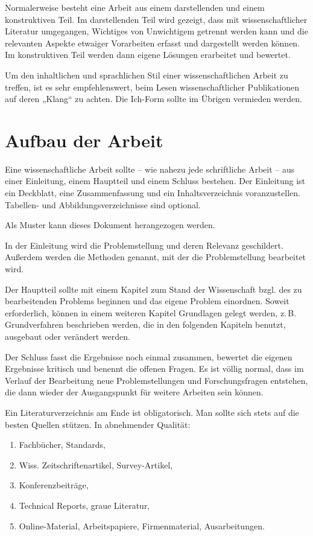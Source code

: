 \documentclass[
    fontsize=12pt,
    headings=small,
    parskip=half,           %
    bibliography=totoc,
    numbers=noenddot,       %
    open=any,               %
    ]{scrreprt}
\begin{document}
Normalerweise besteht eine Arbeit aus einem darstellenden und einem konstruktiven Teil. Im darstellenden Teil wird gezeigt, dass mit wissenschaftlicher Literatur umgegangen, Wichtiges von Unwichtigem getrennt werden kann und die relevanten Aspekte etwaiger Vorarbeiten erfasst und dargestellt werden können. Im konstruktiven Teil werden dann eigene Lösungen erarbeitet und bewertet.

Um den inhaltlichen und sprachlichen Stil einer wissenschaftlichen Arbeit zu treffen, ist es sehr empfehlenswert, beim Lesen wissenschaftlicher Publikationen auf deren „Klang“ \cite{Tolk2003} zu achten. Die Ich-Form sollte im Übrigen vermieden werden.

\section{Aufbau der Arbeit}

Eine wissenschaftliche Arbeit sollte -- wie nahezu jede schriftliche Arbeit -- aus einer Einleitung, einem Hauptteil und einem Schluss bestehen. Der Einleitung ist ein Deckblatt, eine Zusammenfassung und ein Inhaltsverzeichnis voranzustellen. Tabellen- und Abbildungsverzeichnisse sind optional.

Als Muster kann dieses Dokument herangezogen werden.

In der Einleitung wird die Problemstellung und deren Relevanz geschildert. Außerdem werden die Methoden genannt, mit der die Problemstellung bearbeitet wird.

Der Hauptteil sollte mit einem Kapitel zum Stand der Wissenschaft bzgl. des zu bearbeitenden Problems beginnen und das eigene Problem einordnen. Soweit erforderlich, können in einem weiteren Kapitel Grundlagen gelegt werden, z.\,B. Grundverfahren beschrieben werden, die in den folgenden Kapiteln benutzt, ausgebaut oder verändert werden.

Der Schluss fasst die Ergebnisse noch einmal zusammen, bewertet die eigenen Ergebnisse kritisch und benennt die offenen Fragen. Es ist völlig normal, dass im Verlauf der Bearbeitung neue Problemstellungen und Forschungsfragen entstehen, die dann wieder der Ausgangspunkt für weitere Arbeiten sein können.

Ein Literaturverzeichnis am Ende ist obligatorisch. Man sollte sich stets auf die besten Quellen stützen. In abnehmender Qualität:

\begin{enumerate}
	\item Fachbücher, Standards,
	\item Wiss. Zeitschriftenartikel, Survey-Artikel,
	\item Konferenzbeiträge,
	\item Technical Reports, graue Literatur,
	\item Online-Material, Arbeitspapiere, Firmenmaterial, Ausarbeitungen.
\end{enumerate}
\end{document}
